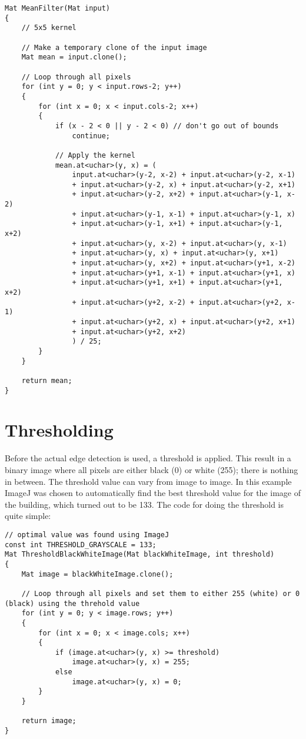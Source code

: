 \begin{lstlisting}
Mat MeanFilter(Mat input)
{
	// 5x5 kernel

	// Make a temporary clone of the input image
	Mat mean = input.clone();

	// Loop through all pixels
	for (int y = 0; y < input.rows-2; y++)
	{
		for (int x = 0; x < input.cols-2; x++)
		{
			if (x - 2 < 0 || y - 2 < 0) // don't go out of bounds
				continue;

			// Apply the kernel
			mean.at<uchar>(y, x) = (
				input.at<uchar>(y-2, x-2) + input.at<uchar>(y-2, x-1)
				+ input.at<uchar>(y-2, x) + input.at<uchar>(y-2, x+1)
				+ input.at<uchar>(y-2, x+2) + input.at<uchar>(y-1, x-2)
				+ input.at<uchar>(y-1, x-1) + input.at<uchar>(y-1, x)
				+ input.at<uchar>(y-1, x+1) + input.at<uchar>(y-1, x+2)
				+ input.at<uchar>(y, x-2) + input.at<uchar>(y, x-1)
				+ input.at<uchar>(y, x) + input.at<uchar>(y, x+1)
				+ input.at<uchar>(y, x+2) + input.at<uchar>(y+1, x-2)
				+ input.at<uchar>(y+1, x-1) + input.at<uchar>(y+1, x)
				+ input.at<uchar>(y+1, x+1) + input.at<uchar>(y+1, x+2)
				+ input.at<uchar>(y+2, x-2)	+ input.at<uchar>(y+2, x-1)
				+ input.at<uchar>(y+2, x) + input.at<uchar>(y+2, x+1)
				+ input.at<uchar>(y+2, x+2)
				) / 25;
		}
	}

	return mean;
}
\end{lstlisting}

\section{Thresholding}
Before the actual edge detection is used, a threshold is applied. This result in a binary image where all pixels are either black (0) or white (255); there is nothing in between. The threshold value can vary from image to image. In this example ImageJ was chosen to automatically find the best threshold value for the image of the building, which turned out to be 133. The code  for doing the threshold is quite simple:

\begin{lstlisting}
// optimal value was found using ImageJ
const int THRESHOLD_GRAYSCALE = 133; 
Mat ThresholdBlackWhiteImage(Mat blackWhiteImage, int threshold)
{
	Mat image = blackWhiteImage.clone();

	// Loop through all pixels and set them to either 255 (white) or 0 (black) using the threhold value
	for (int y = 0; y < image.rows; y++)
	{
		for (int x = 0; x < image.cols; x++)
		{
			if (image.at<uchar>(y, x) >= threshold)
				image.at<uchar>(y, x) = 255;
			else
				image.at<uchar>(y, x) = 0;
		}
	}

	return image;
}
\end{lstlisting}

